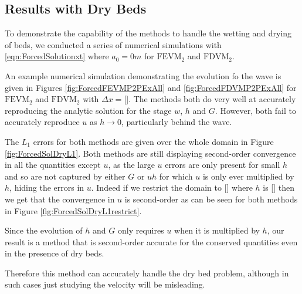 \subsection{Results with Dry Beds} 
To demonstrate the capability of the methods to handle the wetting and drying of beds, we conducted a series of numerical simulations with \eqref{eqn:ForcedSolutionxt} where $a_0 = 0m$ for $\text{FEVM}_2$ and $\text{FDVM}_2$. 

An example numerical simulation demonstrating the evolution fo the wave is given in Figures \ref{fig:ForcedFEVMP2PExAll} and \ref{fig:ForcedFDVMP2PExAll} for $\text{FEVM}_2$ and $\text{FDVM}_2$ with $\Delta x = $[]. The methods both do very well at accurately reproducing the analytic solution for the stage $w$, $h$ and $G$. However, both fail to accurately reproduce $u$ as $h \rightarrow 0$, particularly behind the wave. 




The $L_1$ errors for both methods are given over the whole domain in Figure \ref{fig:ForcedSolDryL1}. Both methods are still displaying second-order convergence in all the quantities except $u$, as the large $u$ errors are only present for small $h$ and so are not captured by either $G$ or $uh$ for which $u$ is only ever multiplied by $h$, hiding the errors in $u$. Indeed if we restrict the domain to [] where $h$ is [] then we get that the convergence in $u$ is second-order as can be seen for both methods in Figure \ref{fig:ForcedSolDryL1restrict}.

Since the evolution of $h$ and $G$ only requires $u$ when it is multiplied by $h$, our result is a method that is second-order accurate for the conserved quantities even in the presence of dry beds.

Therefore this method can accurately handle the dry bed problem, although in such cases just studying the velocity will be misleading. 



